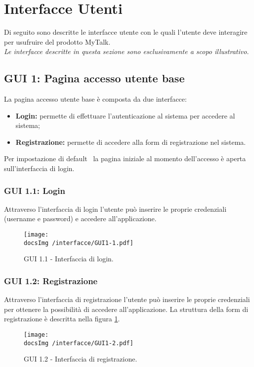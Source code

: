 \section{Interfacce Utenti}
Di seguito sono descritte le interfacce utente con le quali l'utente deve interagire per usufruire del prodotto MyTalk.\\
\textit{Le interfacce descritte in questa sezione sono esclusivamente a scopo illustrativo.}

\subsection{GUI 1: Pagina accesso utente base}
La pagina accesso utente base è composta da due interfacce:
\begin{itemize}
\item \textbf{Login:} permette di effettuare l'autenticazione al sistema per accedere al sistema;
\item \textbf{Registrazione:} permette di accedere alla form di registrazione nel sistema.
\end{itemize}
Per impostazione di default\g~ la pagina iniziale al momento dell'accesso è aperta sull'interfaccia di login.

\subsubsection{GUI 1.1: Login}
Attraverso l'interfaccia di login l'utente può inserire le proprie credenziali (username e password) e accedere all'applicazione.
\begin{figure}[htbp]
\centering
\texttt{[image: \\docsImg /interfacce/GUI1-1.pdf]}
\caption{GUI 1.1 - Interfaccia di login.}
\end{figure}

\newpage
\subsubsection{GUI 1.2: Registrazione}
Attraverso l’interfaccia di registrazione l’utente può inserire le proprie credenziali per ottenere la possibilità di accedere all’applicazione. La struttura della form di registrazione è descritta nella figura \ref{figGUI12}.
\begin{figure}[htbp]
\centering
\texttt{[image: \\docsImg /interfacce/GUI1-2.pdf]}
\label{figGUI12}
\caption{GUI 1.2 - Interfaccia di registrazione.}
\end{figure}

